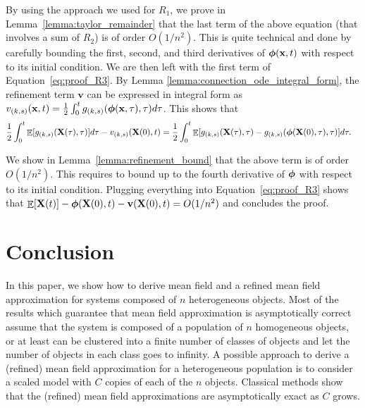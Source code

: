 \documentclass[acmsmall]{acmart}
\newcommand\bx{\mathbf{x}}
\newcommand\bX{\mathbf{X}}
\newcommand\bv{\mathbf{v}}
\newcommand\bphi{\text{\boldmath$\phi$}}
\DeclareMathOperator{\E}{\mathbb{E}} %
\begin{document}
By using the approach we used for $R_1$, we prove in Lemma~\ref{lemma:taylor_remainder} that the last term of the above equation (that involves a sum of $R_2$) is of order $O(1/n^2)$. This is quite technical and done by carefully bounding the first, second, and third derivatives of $\bphi(\bx,t)$ with respect to its initial condition. We are then left with the first term of Equation~\eqref{eq:proof_R3}. By Lemma \ref{lemma:connection_ode_integral_form}, the refinement term $\bv$ can be expressed in integral form as $v_{(k,s)}(\bx, t) = \frac{1}{2}\int_0^t g_{(k,s)}(\bphi(\bx, \tau), \tau) d\tau$. This shows that
\begin{align*}
  \frac{1}{2} \int_0^t \E [g_{(k,s)}(\bX(\tau),\tau)]d\tau- v_{(k,s)}(\bX(0), t)&=\frac{1}{2} \int_0^t \E [g_{(k,s)}(\bX(\tau),\tau)- g_{(k,s)}(\bphi(\bX(0), \tau),\tau)]d\tau.
\end{align*}

We show in Lemma~\ref{lemma:refinement_bound} that the above term is of order $O(1/n^2)$. This requires to bound up to the fourth derivative of $\bphi$ with respect to its initial condition. Plugging everything into Equation~\eqref{eq:proof_R3} shows that $\E[\bX(t)] - \bphi(\bX(0),t) - \bv(\bX(0),t) = O(1/n^2)$ and concludes the proof.


\section{Conclusion}
\label{sec:conclusion}

In this paper, we show how to derive mean field and a refined mean field approximation for systems composed of $n$ heterogeneous objects. Most of the results which guarantee that mean field approximation is asymptotically correct assume that the system is composed of a population of $n$ homogeneous objects, or at least can be clustered into a finite number of classes of objects and let the number of objects in each class goes to infinity. A possible approach to derive a (refined) mean field approximation for a heterogeneous population is to consider a scaled model with $C$ copies of each of the $n$ objects. Classical methods show that the (refined) mean field approximations are asymptotically exact as $C$ grows.
\end{document}
